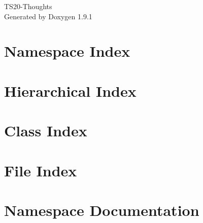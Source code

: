 \let\mypdfximage\pdfximage\def\pdfximage{\immediate\mypdfximage}\documentclass[twoside]{book}
\newcommand{\+}{\discretionary{\mbox{\scriptsize$\hookleftarrow$}}{}{}}
\newcommand{\clearemptydoublepage}{%
  \newpage{\pagestyle{empty}\cleardoublepage}%
}
\begin{document}
\raggedbottom

\hypersetup{pageanchor=false,
             bookmarksnumbered=true,
             pdfencoding=unicode
            }
\begin{titlepage}
\vspace*{7cm}
\begin{center}%
{\Large TS20-\/\+Thoughts }\\
\vspace*{1cm}
{\large Generated by Doxygen 1.9.1}\\
\end{center}
\end{titlepage}
\clearemptydoublepage
{}
\tableofcontents
\clearemptydoublepage
{}
\hypersetup{pageanchor=true}

\chapter{Namespace Index}

\chapter{Hierarchical Index}

\chapter{Class Index}

\chapter{File Index}

\chapter{Namespace Documentation}






\end{document}
